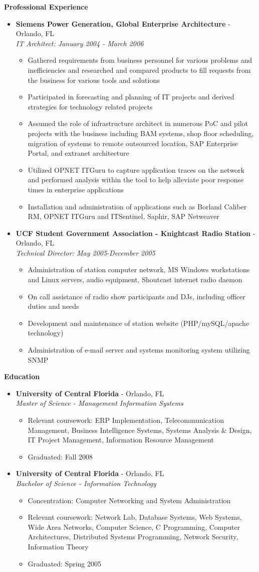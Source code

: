 \documentclass[10pt,oneside]{article}
\newenvironment{ressection}[1]{
	\vspace{4pt}
	\textbf{\selectfont\normalsize#1}
	\begin{itemize}
	\vspace{3pt}
}{
	\end{itemize}
}
\newcommand{\ressubitem}[1]{
	\vspace{-1pt}
	\item \begin{flushleft} #1 \end{flushleft}
}
\newcommand{\resbigitem}[3]{
	\vspace{-5pt}
	\item
	\textbf{#1} - #2 \\
	\textit{#3}
}
\newenvironment{ressubsec}[3]{
	\resbigitem{#1}{#2}{#3}
	\vspace{-2pt}
	\begin{itemize}
}{
	\end{itemize}
}
\begin{document}
\begin{ressection}{Professional Experience}
	\begin{ressubsec}{Siemens Power Generation, Global Enterprise Architecture}{Orlando, FL}{IT Architect: January 2004 - March 2006}
		\ressubitem{Gathered requirements from business personnel for various problems and inefficiencies and researched and compared products to fill requests from the business for various tools and solutions}
		\ressubitem{Participated in forecasting and planning of IT projects and derived strategies for technology related projects}
		\ressubitem{Assumed the role of infrastructure architect in numerous PoC and pilot projects with the business including BAM systems, shop floor scheduling, migration of systems to remote outsourced location, SAP Enterprise Portal, and extranet architecture}
		\ressubitem{Utilized OPNET ITGuru to capture application traces on the network and performed analysis within the tool to help alleviate poor response times in enterprise applications}
		\ressubitem{Installation and administration of applications such as Borland Caliber RM, OPNET ITGuru and ITSentinel, Saphir, SAP Netweaver}
	\end{ressubsec}

	\begin{ressubsec}{UCF Student Government Association - Knightcast Radio Station}{Orlando, FL}{Technical Director: May 2005-December 2005}
		\ressubitem{Administration of station computer network, MS Windows workstations and Linux servers, audio equipment, Shoutcast internet radio daemon}
		\ressubitem{On call assistance of radio show participants and DJs, including officer duties and needs}
		\ressubitem{Development and maintenance of station website (PHP/mySQL/apache technology)}
		\ressubitem{Administration of e-mail server and systems monitoring system utilizing SNMP}
	\end{ressubsec}

\end{ressection}


\begin{ressection}{Education}

	\begin{ressubsec}{University of Central Florida}{Orlando, FL}{Master of Science - Management Information Systems}
		\ressubitem{Relevant coursework: ERP Implementation, Telecommunication Management, Business Intelligence Systems, Systems Analysis \& Design, IT Project Management, Information Resource Management}
		\ressubitem{Graduated: Fall 2008}
	\end{ressubsec}

	\begin{ressubsec}{University of Central Florida}{Orlando, FL}{Bachelor of Science - Information Technology}
		\ressubitem{Concentration: Computer Networking and System Administration}
		\ressubitem{Relevant coursework: Network Lab, Database Systems, Web Systems, Wide Area Networks, Computer Science, C Programming, Computer Architectures, Distributed Systems Programming, Network Security, Information Theory}
		\ressubitem{Graduated: Spring 2005}
	\end{ressubsec}

\end{ressection}
\end{document}
